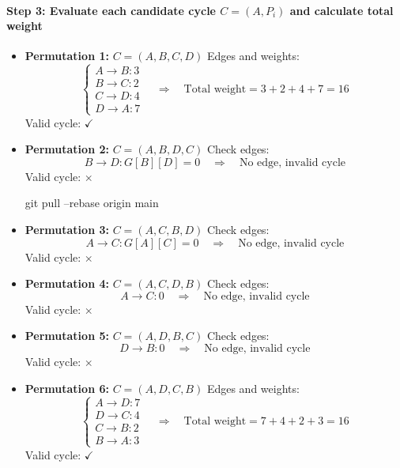\paragraph{Step 3: Evaluate each candidate cycle $C = (A, P_i)$ and calculate total weight}

\begin{itemize}

\item \textbf{Permutation 1:} $C = (A, B, C, D)$  
Edges and weights:
\[
\begin{cases}
A \to B: 3 \\
B \to C: 2 \\
C \to D: 4 \\
D \to A: 7
\end{cases}
\quad \Rightarrow \quad
\text{Total weight} = 3 + 2 + 4 + 7 = 16
\]
Valid cycle: $\checkmark$

\vspace{0.5em}

\item \textbf{Permutation 2:} $C = (A, B, D, C)$  
Check edges:
\[
B \to D: G[B][D] = 0 \quad \Rightarrow \quad \text{No edge, invalid cycle}
\]
Valid cycle: $\times$

\vspace{0.5em}
git pull --rebase origin main
\item \textbf{Permutation 3:} $C = (A, C, B, D)$  
Check edges:
\[
A \to C: G[A][C] = 0 \quad \Rightarrow \quad \text{No edge, invalid cycle}
\]
Valid cycle: $\times$

\vspace{0.5em}

\item \textbf{Permutation 4:} $C = (A, C, D, B)$  
Check edges:
\[
A \to C: 0 \quad \Rightarrow \quad \text{No edge, invalid cycle}
\]
Valid cycle: $\times$

\vspace{0.5em}

\item \textbf{Permutation 5:} $C = (A, D, B, C)$  
Check edges:
\[
D \to B: 0 \quad \Rightarrow \quad \text{No edge, invalid cycle}
\]
Valid cycle: $\times$

\vspace{0.5em}

\item \textbf{Permutation 6:} $C = (A, D, C, B)$  
Edges and weights:
\[
\begin{cases}
A \to D: 7 \\
D \to C: 4 \\
C \to B: 2 \\
B \to A: 3
\end{cases}
\quad \Rightarrow \quad
\text{Total weight} = 7 + 4 + 2 + 3 = 16
\]
Valid cycle: $\checkmark$

\end{itemize}

